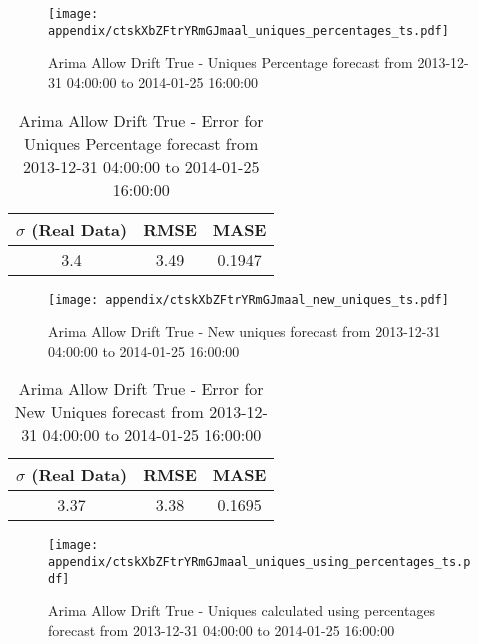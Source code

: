 \begin{figure}[H] \begin{center} \leavevmode
\texttt{[image: appendix/ctskXbZFtrYRmGJmaal\_uniques\_percentages\_ts.pdf]} \caption{
Arima Allow Drift True - Uniques Percentage forecast from 2013-12-31 04:00:00 to 2014-01-25 16:00:00} \label{fig:appendix/ctskXbZFtrYRmGJmaal_uniques_percentages_ts.pdf} \end{center}
\end{figure}

\begin{table}[H]
\centering
\footnotesize
\begin{tabular}{ccc}
$\sigma$ (Real Data) & RMSE & MASE   \\ \hline
3.4 & 3.49 & 0.1947 \\
\end{tabular}

\vspace{0.5cm}

\caption{
Arima Allow Drift True - Error for Uniques Percentage forecast from 2013-12-31 04:00:00 to 2014-01-25 16:00:00}
\end{table}

\begin{figure}[H] \begin{center} \leavevmode
\texttt{[image: appendix/ctskXbZFtrYRmGJmaal\_new\_uniques\_ts.pdf]} \caption{
Arima Allow Drift True - New uniques forecast from 2013-12-31 04:00:00 to 2014-01-25 16:00:00} \label{fig:appendix/ctskXbZFtrYRmGJmaal_new_uniques_ts.pdf} \end{center}
\end{figure}

\begin{table}[H]
\centering
\footnotesize
\begin{tabular}{ccc}
$\sigma$ (Real Data) & RMSE & MASE   \\ \hline
3.37 & 3.38 & 0.1695 \\
\end{tabular}

\vspace{0.5cm}

\caption{
Arima Allow Drift True - Error for New Uniques forecast from 2013-12-31 04:00:00 to 2014-01-25 16:00:00}
\end{table}

\begin{figure}[H] \begin{center} \leavevmode
\texttt{[image: appendix/ctskXbZFtrYRmGJmaal\_uniques\_using\_percentages\_ts.pdf]} \caption{
Arima Allow Drift True - Uniques calculated using percentages forecast from 2013-12-31 04:00:00 to 2014-01-25 16:00:00} \label{fig:appendix/ctskXbZFtrYRmGJmaal_uniques_using_percentages_ts.pdf} \end{center}
\end{figure}

